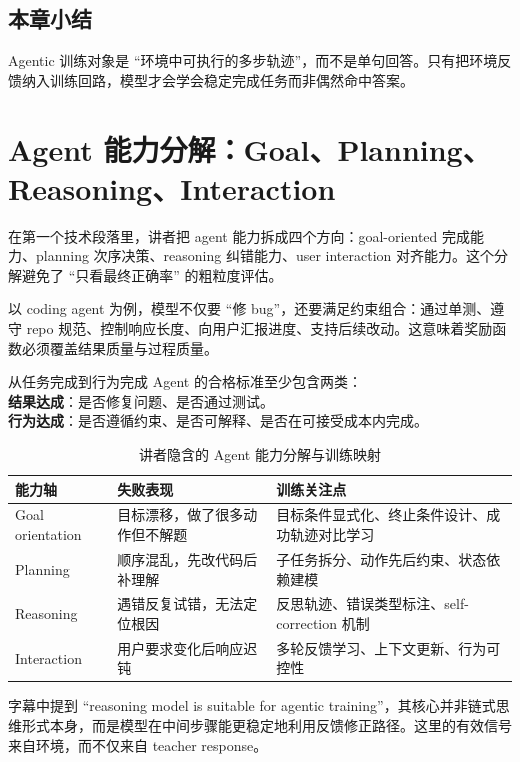 \documentclass[a4paper]{article}
\begin{document}
\subsection{本章小结}
Agentic 训练对象是 ``环境中可执行的多步轨迹''，而不是单句回答。只有把环境反馈纳入训练回路，模型才会学会稳定完成任务而非偶然命中答案。

\section{Agent 能力分解：Goal、Planning、Reasoning、Interaction}

在第一个技术段落里，讲者把 agent 能力拆成四个方向：goal-oriented 完成能力、planning 次序决策、reasoning 纠错能力、user interaction 对齐能力。这个分解避免了 ``只看最终正确率'' 的粗粒度评估。

以 coding agent 为例，模型不仅要 ``修 bug''，还要满足约束组合：通过单测、遵守 repo 规范、控制响应长度、向用户汇报进度、支持后续改动。这意味着奖励函数必须覆盖结果质量与过程质量。

\begin{importantbox}{从任务完成到行为完成}
Agent 的合格标准至少包含两类：\\
\textbf{结果达成}：是否修复问题、是否通过测试。\\
\textbf{行为达成}：是否遵循约束、是否可解释、是否在可接受成本内完成。
\end{importantbox}

\begin{table}[H]
\centering
\begin{tabular}{p{2.2cm}p{3.8cm}p{5.5cm}}
\toprule
\textbf{能力轴} & \textbf{失败表现} & \textbf{训练关注点} \\
\midrule
Goal orientation & 目标漂移，做了很多动作但不解题 & 目标条件显式化、终止条件设计、成功轨迹对比学习 \\
Planning & 顺序混乱，先改代码后补理解 & 子任务拆分、动作先后约束、状态依赖建模 \\
Reasoning & 遇错反复试错，无法定位根因 & 反思轨迹、错误类型标注、self-correction 机制 \\
Interaction & 用户要求变化后响应迟钝 & 多轮反馈学习、上下文更新、行为可控性 \\
\bottomrule
\end{tabular}
\caption{讲者隐含的 Agent 能力分解与训练映射}
\end{table}

字幕中提到 ``reasoning model is suitable for agentic training''，其核心并非链式思维形式本身，而是模型在中间步骤能更稳定地利用反馈修正路径。这里的有效信号来自环境，而不仅来自 teacher response。
\end{document}
